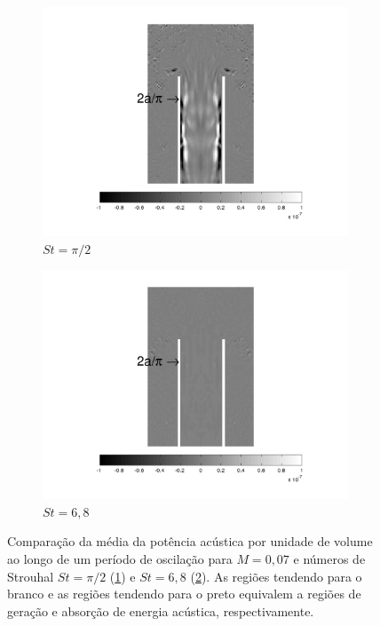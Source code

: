 \begin{figure}[ht!]
\begin{subfigure}{0.5\textwidth}
  \centering
  \includegraphics[width=1.1\linewidth]{figuras/max_007_media.png}
  \caption{$St = \pi/2$}
  \label{fig:comparacao_007_max}
\end{subfigure}%
\begin{subfigure}{0.5\textwidth}
  \centering
  \includegraphics[width=1.1\linewidth]{figuras/min_007_media.png}
  \caption{$St = 6,8$}
  \label{fig:comparacao_007_min}
\end{subfigure}
\caption[Comparação da média da potência acústica por unidade de volume ao longo de um período de oscilação para $M = 0,07$ e números de Strouhal $St = \pi/2$ e $St = 6,8$.]{Comparação da média da potência acústica por unidade de volume ao longo de um período de oscilação para $M = 0,07$ e números de Strouhal $St = \pi/2$ (\ref{fig:comparacao_007_max}) e $St = 6,8$ (\ref{fig:comparacao_007_min}). As regiões tendendo para o branco e as regiões tendendo para o preto equivalem a regiões de geração e absorção de energia acústica, respectivamente.}
\label{fig:comparacao_007_media}
\end{figure}

